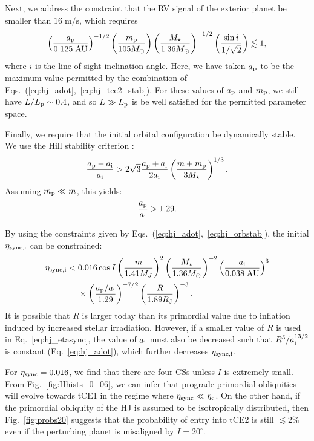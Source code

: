 \documentclass[
        fleqn,
        usenatbib,
    ]{mnras}
\newcommand*{\p}[1]{\left(#1\right)}
\begin{document}
Next, we address the constraint that the RV signal of the exterior planet be
smaller than $16\;\mathrm{m/s}$, which requires
\begin{equation}
    \p{\frac{a_{\rm p}}{0.125\;\mathrm{AU}}}^{-1/2}
    \p{\frac{m_{\rm p}}{105M_{\oplus}}}
    \p{\frac{M_\star}{1.36M_{\odot}}}^{-1/2}
    \p{\frac{\sin i}{1 / \sqrt{2}}} \lesssim 1,
    \label{eq:hj_rv}
\end{equation}
where $i$ is the line-of-sight inclination angle. Here, we have taken $a_{\rm
p}$ to be the maximum value permitted by the combination of
Eqs.~(\ref{eq:hj_adot},~\ref{eq:hj_tce2_stab}). For these values of $a_{\rm p}$
and $m_{\rm p}$, we still have $L / L_{\rm p} \sim 0.4$, and so $L \gg L_{\rm
p}$ is be well satisfied for the permitted parameter space.

Finally, we require that the initial orbital configuration be dynamically
stable. We use the Hill stability criterion \citep[e.g.][]{petit2020path}:
\begin{equation}
    \frac{a_{\rm p} - a_{\rm i}}{a_{\rm i}} > 2\sqrt{3}\frac{a_{\rm p} + a_{\rm
        i}}{2a_{\rm i}} \p{\frac{m + m_{\rm p}}{3M_{\star}}}^{1/3}.
\end{equation}
Assuming $m_{\rm p} \ll m$, this yields:
\begin{equation}
    \frac{a_{\rm p}}{a_{\rm i}} > 1.29.\label{eq:hj_orbstab}
\end{equation}

By using the constraints given by Eqs.~(\ref{eq:hj_adot},~\ref{eq:hj_orbstab}),
the initial $\eta_{\rm sync, i}$ can be constrained:
\begin{align}
    \eta_{\rm sync, i} <{}& 0.016 \cos I\p{\frac{m}{1.41M_J}}^2
            \p{\frac{M_\star}{1.36M_{\odot}}}^{-2}
            \p{\frac{a_{\rm i}}{0.038\;\mathrm{AU}}}^{3}\nonumber\\
        &\times \p{\frac{a_{\rm p} / a_{\rm i}}{1.29}}^{-7/2}
            \p{\frac{R}{1.89R_{\rm J}}}^{-3}.\label{eq:hj_etasync}
\end{align}
It is possible that $R$ is larger today than its primordial value due to
inflation induced by increased stellar irradiation. However, if a smaller value
of $R$ is used in Eq.~\eqref{eq:hj_etasync}, the value of $a_{\rm i}$ must also
be decreased such that $R^5 / a_{\rm i}^{13/2}$ is constant
(Eq.~\ref{eq:hj_adot}), which further decreases $\eta_{\rm sync, i}$.

For $\eta_{\rm sync} = 0.016$, we find that there are four CSs unless $I$ is
extremely small. From Fig.~\ref{fig:Hhists_0_06}, we can infer that prograde
primordial obliquities will evolve towards tCE1 in the regime where $\eta_{\rm
sync} \ll \eta_{\rm c}$. On the other hand, if the primordial obliquity of the
HJ is assumed to be isotropically distributed, then Fig.~\ref{fig:probs20}
suggests that the probability of entry into tCE2 is still $\lesssim 2\%$ even if
the perturbing planet is misaligned by $I = 20^\circ$.
\end{document}

